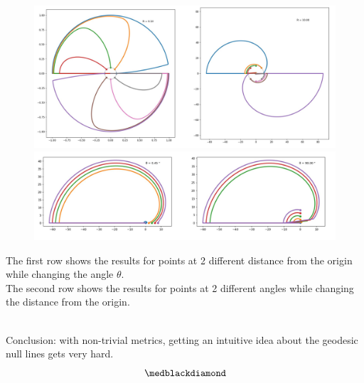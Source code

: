 \newpage
\begin{figure}[htp] 
    \centering
\includegraphics[scale=.4]{nullgeodesics_theta.jpg}
\includegraphics[scale=.45]{nullgeodesics_R.jpg}
\end{figure}
The first row shows the results for points at 2 different distance from the origin while changing the angle $\theta$. \\
The second row shows the results for points at 2 different angles  while changing the distance from the origin. \\\

Conclusion: with non-trivial metrics, getting an intuitive idea about the geodesic null lines gets very hard.
$$\medblackdiamond$$
\newpage